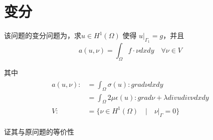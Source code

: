 \documentclass[UTF8,titlepage,twocolumn]{ctexart}
\begin{document}
\section{变分}

该问题的变分问题为，求$u \in H^1(\Omega)$ 使得 $u |_{\Gamma_1} = g$，并且
$$
	a(u,\nu) = \int_{\Omega} f \cdot \nu dxdy \quad \forall \nu \in V
$$ 
\par
其中
$$
	\begin{matrix}
		\begin{aligned}
			a(u,\nu) :&= \int_{\Omega} \sigma(u) : grad \nu dxdy \\  
			&= \int_{\Omega} 2 \mu \epsilon(u) : grad \nu + \lambda div u div \nu dxdy \\
			V :&= \{ \nu \in H^1(\Omega) \quad | \quad \nu |_{\Gamma} = 0 \}
		\end{aligned}
	\end{matrix}
$$

证其与原问题的等价性
\end{document}
